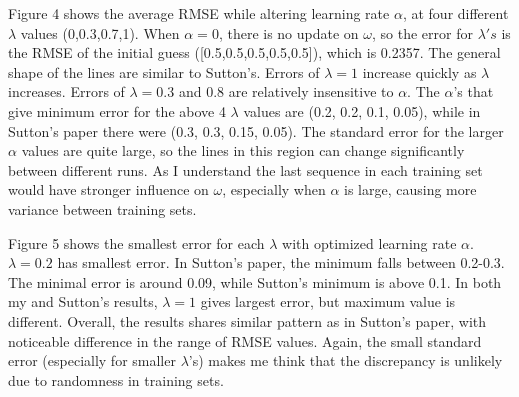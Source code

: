 \documentclass{article}
\begin{document}
Figure 4 shows the average RMSE while altering learning rate $\alpha$, at four different $\lambda$ values (0,0.3,0.7,1). When $\alpha=0$, there is no update on $\omega$, so the error for $\lambda's$ is the RMSE of the initial guess ([0.5,0.5,0.5,0.5,0.5]), which is 0.2357. The general shape of the lines are similar to Sutton's. Errors of $\lambda=1$ increase quickly as $\lambda$ increases. Errors of $\lambda = 0.3$ and $0.8$ are relatively insensitive to $\alpha$. The $\alpha$'s that give minimum error for the above 4 $\lambda$ values are (0.2, 0.2, 0.1, 0.05), while in Sutton's paper there were (0.3, 0.3, 0.15, 0.05). The standard error for the larger $\alpha$ values are quite large, so the lines in this region can change significantly between different runs. As I understand the last sequence in each training set would have stronger influence on $\omega$, especially when $\alpha$ is large, causing more variance between training sets.

Figure 5 shows the smallest error for each $\lambda$ with optimized learning rate $\alpha$. $\lambda=0.2$ has smallest error. In Sutton's paper, the minimum falls between 0.2-0.3. The minimal error is around 0.09, while Sutton's minimum is above 0.1. In both my and Sutton's results, $\lambda=1$ gives largest error, but maximum value is different. Overall, the results shares similar pattern as in Sutton's paper, with noticeable difference in the range of RMSE values. Again, the small standard error (especially for smaller $\lambda$'s) makes me think that the discrepancy is unlikely due to randomness in training sets.
\end{document}
